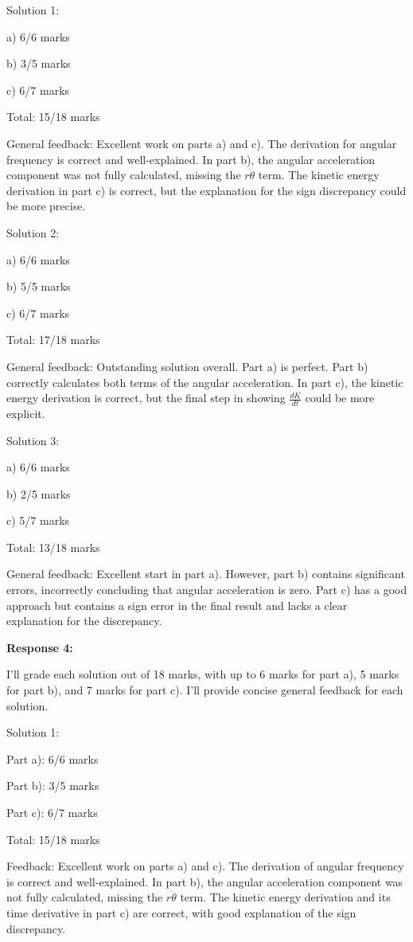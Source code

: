 \documentclass[a4paper,11pt]{article}
\begin{document}
Solution 1:

a) 6/6 marks

b) 3/5 marks

c) 6/7 marks

Total: 15/18 marks

General feedback: Excellent work on parts a) and c). The derivation for angular frequency is correct and well-explained. In part b), the angular acceleration component was not fully calculated, missing the \(r\ddot{\theta}\) term. The kinetic energy derivation in part c) is correct, but the explanation for the sign discrepancy could be more precise.

Solution 2:

a) 6/6 marks

b) 5/5 marks

c) 6/7 marks

Total: 17/18 marks

General feedback: Outstanding solution overall. Part a) is perfect. Part b) correctly calculates both terms of the angular acceleration. In part c), the kinetic energy derivation is correct, but the final step in showing \(\frac{dK}{dt}\) could be more explicit.

Solution 3:

a) 6/6 marks

b) 2/5 marks

c) 5/7 marks

Total: 13/18 marks

General feedback: Excellent start in part a). However, part b) contains significant errors, incorrectly concluding that angular acceleration is zero. Part c) has a good approach but contains a sign error in the final result and lacks a clear explanation for the discrepancy.

\bigskip
\textbf{Response 4:}

I'll grade each solution out of 18 marks, with up to 6 marks for part a), 5 marks for part b), and 7 marks for part c). I'll provide concise general feedback for each solution.

Solution 1:

Part a): 6/6 marks

Part b): 3/5 marks

Part c): 6/7 marks

Total: 15/18 marks

Feedback: Excellent work on parts a) and c). The derivation of angular frequency is correct and well-explained. In part b), the angular acceleration component was not fully calculated, missing the \(r\dot{\theta}\) term. The kinetic energy derivation and its time derivative in part c) are correct, with good explanation of the sign discrepancy.
\end{document}
